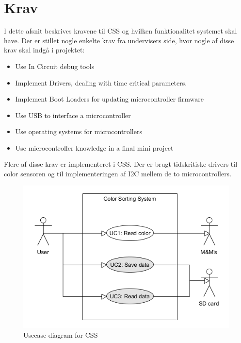 \graphicspath{{Chapters/Krav/}}


\section{Krav}
I dette afsnit beskrives kravene til CSS og hvilken funktionalitet systemet skal have. Der er stillet nogle enkelte krav fra undervisers side, hvor nogle af disse krav skal indgå i projektet:

\begin{itemize}
	\item Use In Circuit debug tools
	
	\item Implement Drivers, dealing with time critical parameters.
	
	\item Implement Boot Loaders for updating microcontroller firmware
	
	\item Use USB to interface a microcontroller
	
	\item Use operating systems for microcontrollers
	
	\item Use microcontroller knowledge in a final mini project
	
\end{itemize}

Flere af disse krav er implementeret i CSS. Der er brugt tidskritiske drivers til color sensoren og til implementeringen af I2C mellem de to microcontrollers. 

\begin{figure}[H]
	\centering
	\includegraphics[width = 400pt]{Img/Usecase_diagram.png}
	\caption{Usecase diagram for CSS}
	\label{fig:UsecaseDiagram}
\end{figure}

